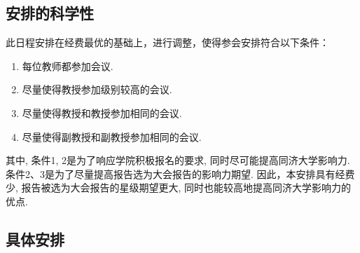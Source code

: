 \documentclass[a4paper,12pt]{ctexart}
\begin{document}
    \subsection{安排的科学性}

    此日程安排在经费最优的基础上，进行调整，使得参会安排符合以下条件：
    \begin{enumerate}
        \item 每位教师都参加会议.
        \item 尽量使得教授参加级别较高的会议.
        \item 尽量使得教授和教授参加相同的会议.
        \item 尽量使得副教授和副教授参加相同的会议.
    \end{enumerate}
    其中, 条件1, 2是为了响应学院积极报名的要求, 同时尽可能提高同济大学影响力.
    条件2、3是为了尽量提高报告选为大会报告的影响力期望.
    因此，本安排具有经费少, 报告被选为大会报告的星级期望更大, 同时也能较高地提高同济大学影响力的优点.

    \subsection{具体安排}
\end{document}
